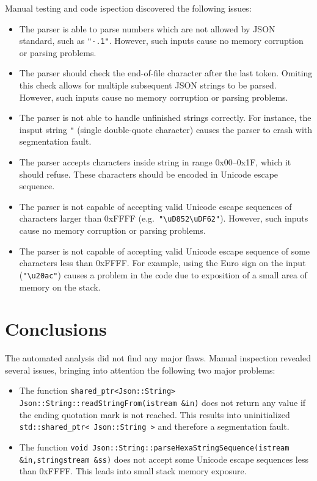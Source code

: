 \documentclass[11pt]{article}
\begin{document}
Manual testing and code ispection discovered the following issues:
\begin{itemize}[itemsep=0pt]
\item The parser is able to parse numbers which are not allowed by JSON standard, such as \texttt{"-.1"}. However, such inputs cause no memory corruption or parsing problems.
\item The parser should check the end-of-file character after the last token. Omiting this check allows for multiple subsequent JSON strings to be parsed. However, such inputs cause no memory corruption or parsing problems.
\item The parser is not able to handle unfinished strings correctly. For instance, the insput string \texttt{"} (single double-quote character) causes the parser to crash with segmentation fault.
\item The parser accepts characters inside string in range 0x00--0x1F, which it should refuse. These characters should be encoded in Unicode escape sequence.
\item The parser is not capable of accepting valid Unicode escape sequences of characters larger than 0xFFFF (e.g.\ \texttt{"\textbackslash{}uD852\textbackslash{}uDF62"}). However, such inputs cause no memory corruption or parsing problems.
\item The parser is not capable of accepting valid Unicode escape sequence of some characters less than 0xFFFF. For example, using the Euro sign on the input (\texttt{"\textbackslash{}u20ac"}) causes a problem in the code due to exposition of a small area of memory on the stack.
\end{itemize}

\section{Conclusions}

The automated analysis did not find any major flaws. Manual inspection revealed several issues, bringing into attention the following two major problems:
\begin{itemize}[itemsep=0pt]
\item The function \texttt{shared\_ptr<Json::String> Json::String::readStringFrom(istream \&in)} does not return any value if the ending quotation mark is not reached. This results into uninitialized \texttt{std::shared\_ptr< Json::String >} and therefore a segmentation fault.
\item The function \texttt{void Json::String::parseHexaStringSequence(istream \&in,stringstream \&ss)} does not accept some Unicode escape sequences less than 0xFFFF. This leads into small stack memory exposure.
\end{itemize}
\end{document}

